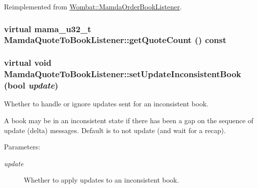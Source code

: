 Reimplemented from \hyperlink{classWombat_1_1MamdaOrderBookListener_a1486090a37ac30c038d18a38ae89d72}{Wombat::Mamda\-Order\-Book\-Listener}.\hypertarget{classMamdaQuoteToBookListener_55fd792381e1d706b160a2fbd7fe7ad4}{
\subsubsection[getQuoteCount]{\setlength{\rightskip}{0pt plus 5cm}virtual mama\_\-u32\_\-t Mamda\-Quote\-To\-Book\-Listener::get\-Quote\-Count () const}}
\label{classMamdaQuoteToBookListener_55fd792381e1d706b160a2fbd7fe7ad4}


\hypertarget{classMamdaQuoteToBookListener_99053d73f15f7f0dfc971d341e1e75c6}{
\subsubsection[setUpdateInconsistentBook]{\setlength{\rightskip}{0pt plus 5cm}virtual void Mamda\-Quote\-To\-Book\-Listener::set\-Update\-Inconsistent\-Book (bool {\em update})}}
\label{classMamdaQuoteToBookListener_99053d73f15f7f0dfc971d341e1e75c6}


Whether to handle or ignore updates sent for an inconsistent book. 

A book may be in an inconsistent state if there has been a gap on the sequence of update (delta) messages. Default is to not update (and wait for a recap).

\begin{Desc}
\item[Parameters:]
\begin{description}
\item[{\em update}]Whether to apply updates to an inconsistent book. \end{description}
\end{Desc}



